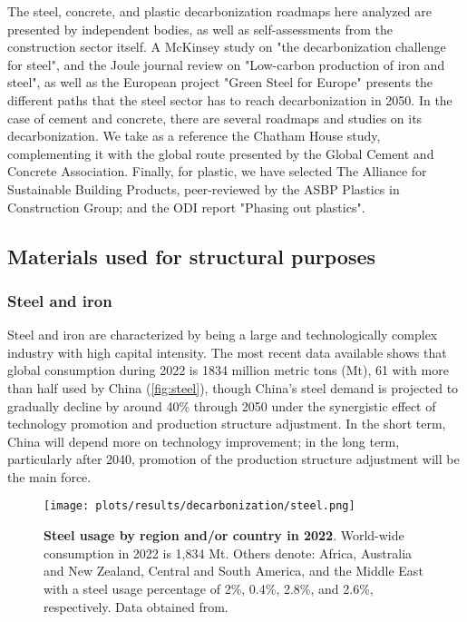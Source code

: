 The steel, concrete, and plastic decarbonization roadmaps here analyzed are presented by independent bodies, as well as self-assessments from the construction sector itself. A McKinsey study on "the decarbonization challenge for steel",\autocite{hoffmann2021decarbonization} and the Joule journal review on "Low-carbon production of iron and steel"\autocite{fan2021low}, as well as the European project "Green Steel for Europe"\autocite{elkerbout2021impact} presents the different paths that the steel sector has to reach decarbonization in 2050. In the case of cement and concrete, there are several roadmaps and studies on its decarbonization. We take as a reference the Chatham House study,\autocite{lehne2018making} complementing it with the global route presented by the Global Cement and Concrete Association.\autocite{cement2021concrete} Finally, for plastic, we have selected The Alliance for Sustainable Building Products, peer-reviewed by the ASBP Plastics in Construction Group;\autocite{asbp_2020} and the ODI report "Phasing out plastics".\autocite{pickard2020phasing}

\subsection{Materials used for structural purposes}
\label{sec:materials_used_for_structural_purposes}

\subsubsection{Steel and iron}
\label{sec:steel_and_iron}

Steel and iron are characterized by being a large and technologically complex industry with high capital intensity. The most recent data available shows that global consumption during 2022 is 1834 million metric tons (Mt), 61 with more than half used by China (\autoref{fig:steel}), though China’s steel demand is projected to gradually decline by around 40\% through 2050\autocite{rissman2020technologies} under the synergistic effect of technology promotion and production structure adjustment. In the short term, China will depend more on technology improvement; in the long term, particularly after 2040, promotion of the production structure adjustment will be the main force.\autocite{zhang2018comprehensive}

\begin{figure}[ht!]
  \centering
  \texttt{[image: plots/results/decarbonization/steel.png]}
  \caption[Steel usage by region and/or country in 2022]{\textbf{Steel usage by region and/or country in 2022}. World-wide consumption in 2022 is 1,834 Mt. Others denote: Africa, Australia and New Zealand, Central and South America, and the Middle East with a steel usage percentage of 2\%, 0.4\%, 2.8\%, and 2.6\%, respectively. Data obtained from.\autocite{worldsteel2022world}}
  \label{fig:steel}
\end{figure}


